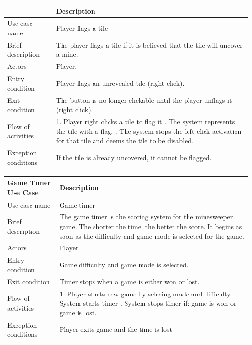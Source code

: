 \documentclass[12pt, a4]{report}
\begin{document}
	\begin{table}[ht]
	\begin{tabular}{|p{4cm}|p{12cm}|}
		\hline
		 & Description \\
		\hline
		Use case name & Player flags a tile \\
		Brief description & The player flags a tile if it is believed that the tile will uncover a mine. \\
		Actors & Player. \\
		Entry condition & Player flags an unrevealed tile (right click). \\
		Exit condition & The button is no longer clickable until the player unflags it (right click). \\
		Flow of activities & 1. Player right clicks a tile to flag it \newline 2. The system represents the tile with a flag. \newline 3. The system stops the left click activation for that tile and deems the tile to be disabled. \\
		Exception conditions & If the tile is already uncovered, it cannot be flagged.\\
		\hline
	\end{tabular}
	\end{table}
\pagebreak
	\begin{table}[ht]
	\begin{tabular}{|p{4cm}|p{12cm}|}
		\hline
		Game Timer Use Case& Description \\
		\hline
		Use case name & Game timer \\
		Brief description & The game timer is the scoring system for the minesweeper game. The shorter the time, the better the score. It begins as soon as the difficulty and game mode is selected for the game. \\
		Actors & Player. \\
		Entry condition & Game difficulty and game mode is selected. \\
		Exit condition & Timer stops when a game is either won or lost. \\
		Flow of activities & 1. Player starts new game by selecing mode and difficulty \newline 2. System starts timer \newline 3. System stops timer if: game is won or game is lost. \\
		Exception conditions & Player exits game and the time is lost.\\
		\hline
	\end{tabular}
	\end{table}
\end{document}
